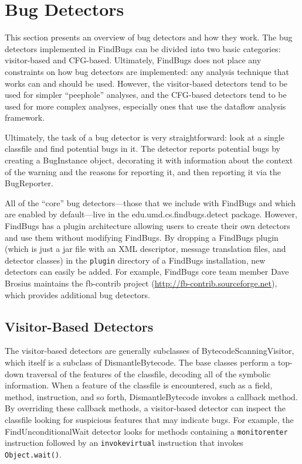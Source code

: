 \documentclass[11pt]{article}
\begin{document}
\section{Bug Detectors}

This section presents an overview of bug detectors and
how they work.  The bug detectors implemented in FindBugs can be divided into
two basic categories: visitor-based and CFG-based.  Ultimately, FindBugs
does not place any constraints on how bug detectors are implemented:
any analysis technique that works can and should be used.  However,
the visitor-based detectors tend to be used for simpler ``peephole''
analyses, and the CFG-based detectors tend to be used for more
complex analyses, especially ones that use the dataflow analysis
framework.

Ultimately, the task of a bug detector is very straightforward:
look at a single classfile and find potential bugs in it.
The detector reports potential bugs by creating a BugInstance object,
decorating it with information about
the context of the warning and the reasons for reporting it,
and then reporting it via the BugReporter.

All of the ``core'' bug detectors---those that we include with FindBugs
and which are enabled by default---live in the edu.umd.cs.findbugs.detect
package.  However, FindBugs has a plugin architecture allowing users
to create their own detectors and use them without modifying FindBugs.
By dropping a FindBugs plugin (which is just a jar file with an XML descriptor,
message translation files, and detector classes) in the
{\tt plugin} directory of a FindBugs installation, new detectors can
easily be added.  For example, FindBugs core team member Dave Brosius maintains
the fb-contrib project (\url{http://fb-contrib.sourceforge.net}), which
provides additional bug detectors.

\subsection{Visitor-Based Detectors}

The visitor-based detectors are generally subclasses of BytecodeScanningVisitor,
which itself is a subclass of DismantleBytecode.  The base classes perform
a top-down traversal of the features of the classfile, decoding all
of the symbolic information.  When a feature of the classfile is encountered,
such as a field, method, instruction, and so forth, 
DismantleBytecode invokes a callback method.
By overriding these callback methods, a visitor-based detector
can inspect the classfile looking for suspicious features that may
indicate bugs.  For example, the FindUnconditionalWait detector looks for
methods containing a {\tt monitorenter} instruction followed by an {\tt invokevirtual}
instruction that invokes {\tt Object.wait()}.
\end{document}
